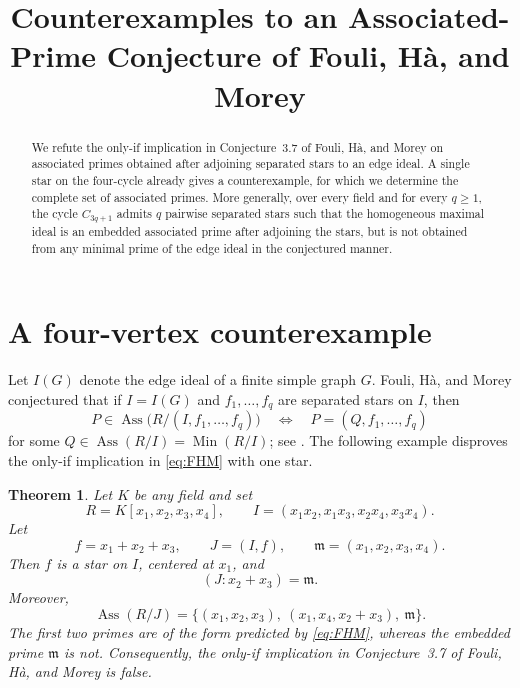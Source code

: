 \documentclass[11pt]{amsart}
\title[Counterexamples to an associated-prime conjecture]
{Counterexamples to an Associated-Prime Conjecture of Fouli, H\`a, and Morey}
\date{}
\newtheorem{theorem}{Theorem}
\theoremstyle{remark}
\DeclareMathOperator{\Ass}{Ass}
\DeclareMathOperator{\Min}{Min}
\begin{document}
\begin{abstract}
We refute the only-if implication in Conjecture~3.7 of Fouli,
H\`a, and Morey on associated primes obtained after adjoining
separated stars to an edge ideal. A single star on the four-cycle
already gives a counterexample, for which we determine the complete
set of associated primes. More generally, over every field and for
every $q\geq 1$, the cycle $C_{3q+1}$ admits $q$ pairwise separated
stars such that the homogeneous maximal ideal is an embedded
associated prime after adjoining the stars, but is not obtained from
any minimal prime of the edge ideal in the conjectured manner.
\end{abstract}

\maketitle

\section{A four-vertex counterexample}

Let $I(G)$ denote the edge ideal of a finite simple graph $G$.
Fouli, H\`a, and Morey conjectured that if $I=I(G)$ and
$f_1,\ldots,f_q$ are separated stars on $I$, then
\begin{equation}\label{eq:FHM}
 P\in\Ass\bigl(R/(I,f_1,\ldots,f_q)\bigr)
 \quad\Longleftrightarrow\quad
 P=(Q,f_1,\ldots,f_q)
\end{equation}
for some $Q\in\Ass(R/I)=\Min(R/I)$; see
\cite[Definitions~2.1--2.2 and Conjecture~3.7]{FHM26}.
The following example disproves the only-if implication in
\eqref{eq:FHM} with one star.

\begin{theorem}\label{thm:C4}
Let $K$ be any field and set
\[
 R=K[x_1,x_2,x_3,x_4],\qquad
 I=(x_1x_2,x_1x_3,x_2x_4,x_3x_4).
\]
Let
\[
 f=x_1+x_2+x_3,\qquad J=(I,f),\qquad
 \mathfrak m=(x_1,x_2,x_3,x_4).
\]
Then $f$ is a star on $I$, centered at $x_1$, and
\[
 (J:x_2+x_3)=\mathfrak m.
\]
Moreover,
\[
 \Ass(R/J)=
 \bigl\{
 (x_1,x_2,x_3),\
 (x_1,x_4,x_2+x_3),\
 \mathfrak m
 \bigr\}.
\]
The first two primes are of the form predicted by
\eqref{eq:FHM}, whereas the embedded prime $\mathfrak m$ is not.
Consequently, the only-if implication in Conjecture~3.7 of
Fouli, H\`a, and Morey is false.
\end{theorem}
\end{document}
